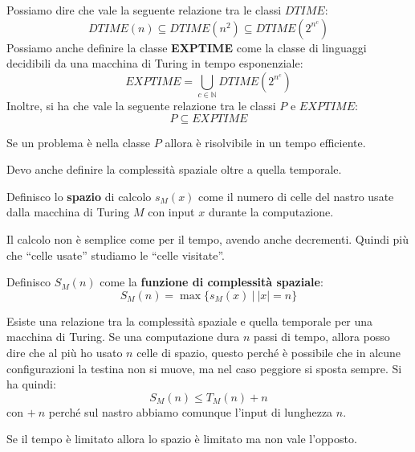 Possiamo dire che vale la seguente relazione tra le classi $DTIME$:
\begin{equation}
    DTIME(n) \subseteq DTIME(n^2) \subseteq DTIME(2^{n^c})
\end{equation}
Possiamo anche definire la classe \textbf{EXPTIME} come la classe di linguaggi
decidibili da una macchina di Turing in tempo esponenziale:
\begin{equation}
    EXPTIME =  \bigcup_{c \in \mathbb{N}} DTIME(2^{n^c})
\end{equation}
Inoltre, si ha che vale la seguente relazione tra le classi $P$ e $EXPTIME$:
\begin{equation}
    P \subseteq EXPTIME
\end{equation}
\begin{teorema}
    Se un problema è nella classe $P$ allora è risolvibile in un tempo efficiente.
\end{teorema}
Devo anche definire la complessità spaziale oltre a quella temporale.
\begin{definizione}
    Definisco lo \textbf{spazio} di calcolo $s_M(x)$ come il numero di celle del
    nastro usate dalla macchina di Turing $M$ con input $x$ durante la
    computazione.

    Il calcolo non è semplice come per il tempo, avendo anche decrementi. Quindi
    più che “celle usate” studiamo le “celle visitate”.
\end{definizione}
\begin{definizione}
    Definisco $S_M(n)$ come la \textbf{funzione di complessità spaziale}:
    \begin{equation}
        S_M(n) =  \max\{s_M(x) \ | \ |x| = n\}
    \end{equation}
\end{definizione}
Esiste una relazione tra la complessità spaziale e quella temporale per una
macchina di Turing. Se una computazione dura $n$ passi di tempo, allora posso
dire che al più ho usato $n$ celle di spazio, questo perché è possibile che in
alcune configurazioni la testina non si muove, ma nel caso peggiore si sposta
sempre. Si ha quindi:
\begin{equation}
    S_M(n) \leq T_M(n) + n
\end{equation}
con $+ \ n$ perché sul nastro abbiamo comunque l'input di lunghezza $n$.
\begin{teorema}
    Se il tempo è limitato allora lo spazio è limitato ma non vale l'opposto.
\end{teorema}

